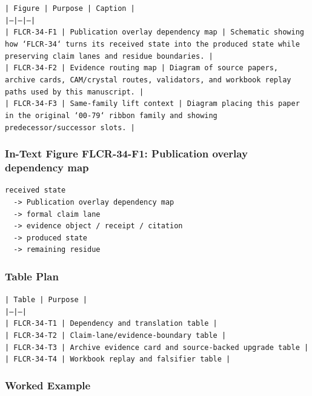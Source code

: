 \documentclass[11pt]{article}
\begin{document}
\noindent\texttt{| Figure | Purpose | Caption |}\\
\noindent\texttt{|---|---|---|}\\
\noindent\texttt{| FLCR-34-F1 | Publication overlay dependency map | Schematic showing how `FLCR-34` turns its received state into the produced state while preserving claim lanes and residue boundaries. |}\\
\noindent\texttt{| FLCR-34-F2 | Evidence routing map | Diagram of source papers, archive cards, CAM/crystal routes, validators, and workbook replay paths used by this manuscript. |}\\
\noindent\texttt{| FLCR-34-F3 | Same-family lift context | Diagram placing this paper in the original `00-79` ribbon family and showing predecessor/successor slots. |}\\

\subsubsection*{In-Text Figure FLCR-34-F1: Publication overlay dependency map}

\begin{verbatim}
received state
  -> Publication overlay dependency map
  -> formal claim lane
  -> evidence object / receipt / citation
  -> produced state
  -> remaining residue
\end{verbatim}

\subsubsection*{Table Plan}

\noindent\texttt{| Table | Purpose |}\\
\noindent\texttt{|---|---|}\\
\noindent\texttt{| FLCR-34-T1 | Dependency and translation table |}\\
\noindent\texttt{| FLCR-34-T2 | Claim-lane/evidence-boundary table |}\\
\noindent\texttt{| FLCR-34-T3 | Archive evidence card and source-backed upgrade table |}\\
\noindent\texttt{| FLCR-34-T4 | Workbook replay and falsifier table |}\\

\subsubsection*{Worked Example}
\end{document}
